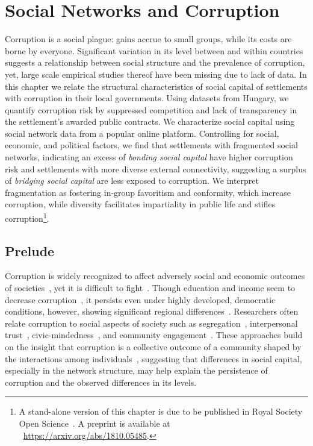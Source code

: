\chapter{Social Networks and Corruption}

Corruption is a social plague: gains accrue to small groups, while its costs are borne by everyone. Significant variation in its level between and within countries suggests a relationship between social structure and the prevalence of corruption, yet, large scale empirical studies thereof have been missing due to lack of data. In this chapter we relate the structural characteristics of social capital of settlements with corruption in their local governments. Using datasets from Hungary, we quantify corruption risk by suppressed competition and lack of transparency in the settlement's awarded public contracts. We characterize social capital using social network data from a popular online platform. Controlling for social, economic, and political factors, we find that settlements with fragmented social networks, indicating an excess of \textit{bonding social capital} have higher corruption risk and settlements with more diverse external connectivity, suggesting a surplus of \textit{bridging social capital} are less exposed to corruption. We interpret fragmentation as fostering in-group favoritism and conformity, which increase corruption, while diversity facilitates impartiality in public life and stifles corruption\footnote{A stand-alone version of this chapter is due to be published in Royal Society Open Science~\cite{wachs2019social}. A preprint is available at ~\url{https://arxiv.org/abs/1810.05485}.}.


\section{Prelude}
Corruption is widely recognized to affect adversely social and economic outcomes of societies~\cite{mauro2004persistence}, yet it is difficult to fight~\cite{mungiu2013controlling}. Though education and income seem to decrease corruption~\cite{glaeser2006corruption}, it persists even under highly developed, democratic conditions, however, showing significant regional differences~\cite{charron2014regional}. Researchers often relate corruption to social aspects of society such as segregation~\cite{alesina2011segregation}, interpersonal trust~\cite{rothstein2005all}, civic-mindedness~\cite{guiso2011civic}, and community engagement~\cite{putnam2001bowling}. These approaches build on the insight that corruption is a collective outcome of a community shaped by the interactions among individuals~\cite{persson2013anticorruption}, suggesting that differences in social capital, especially in the network structure, may help explain the persistence of corruption and the observed differences in its levels.

